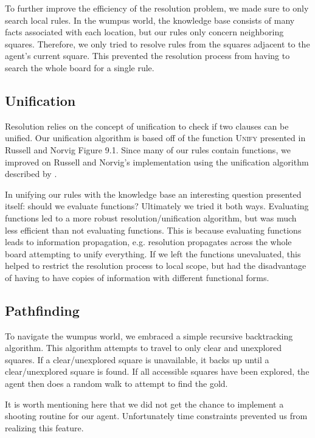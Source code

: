 \documentclass{article}
\begin{document}
To further improve the efficiency of the resolution problem, we made sure to only search local rules. 
In the wumpus world, the knowledge base consists of many facts associated with each location, but our rules only concern neighboring squares. 
Therefore, we only tried to resolve rules from the squares adjacent to the agent's current square. 
This prevented the resolution process from having to search the whole board for a single rule.
\subsection{Unification}

Resolution relies on the concept of unification to check if two clauses can be unified\cite{robinson}. 
Our unification algorithm is based off of the function \textsc{Unify} presented in Russell and Norvig Figure 9.1. Since many of our rules contain functions, we improved on Russell and Norvig's implementation using the unification algorithm described by \cite{robinson}.

In unifying our rules with the knowledge base an interesting question presented itself: should we evaluate functions? Ultimately we tried it both ways. Evaluating functions led to a more robust resolution/unification algorithm, but was much less efficient than not evaluating functions. This is because evaluating functions leads to information propagation, e.g. resolution propagates across the whole board attempting to unify everything. If we left the functions unevaluated, this helped to restrict the resolution process to local scope, but had the disadvantage of having to have copies of information with different functional forms.

\subsection{Pathfinding}

To navigate the wumpus world, we embraced a simple recursive backtracking algorithm. 
This algorithm attempts to travel to only clear and unexplored squares. 
If a clear/unexplored square is unavailable, it backs up until a clear/unexplored square is found. 
If all accessible squares have been explored, the agent then does a random walk to attempt to find the gold.

It is worth mentioning here that we did not get the chance to implement a shooting routine for our agent. Unfortunately time constraints prevented us from realizing this feature.
\end{document}
